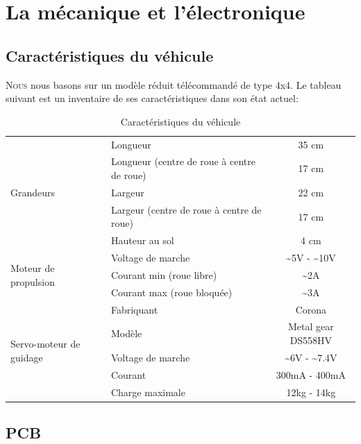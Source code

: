 \documentclass[a4paper,11pt]{report}
\begin{document}
{\chapter{La mécanique et l'électronique}

\section{Caractéristiques du véhicule \label{TableDesc}}
\lettrine{N}{ous} nous basons sur un modèle réduit
télécommandé de type 4x4. Le tableau suivant est un inventaire de 
ses caractéristiques dans son état actuel:
\begin{table}[h!]
\begin{center}
  \begin{tabular}{|p{4cm}|p{4cm}|c|}
    \hline
    \multirow{5}{*}{Grandeurs}
    &Longueur & 35 cm \\ \cline{2-3}
    &Longueur (centre de roue \`a centre de roue)& 17 cm \\ \cline{2-3}
    &Largeur & 22 cm \\ \cline{2-3}
    &Largeur (centre de roue \`a centre de roue) & 17 cm \\ \cline{2-3}
    & Hauteur au sol & 4 cm\\ \hline
    \multirow{3}{*}{Moteur de propulsion}
    & Voltage de marche & \~{}5V - \~{}10V  \\ \cline{2-3}
    & Courant min (roue libre) & \~{}2A \\ \cline{2-3}
    & Courant max (roue bloqu\'ee) & \~{}3A \\ \hline
    \multirow{5}{*}{Servo-moteur de guidage}
    & Fabriquant & Corona \\ \cline{2 - 3}
    & Modèle & Metal gear DS558HV\\ \cline{2-3}
    & Voltage de marche & \~{}6V - \~{}7.4V  \\ \cline{2-3}
    & Courant & 300mA - 400mA \\ \cline{2-3}
    & Charge maximale & 12kg - 14kg \\  
 \hline
	\end{tabular}
\end{center}
\label{caracteristiquesDuVehicule}\caption{Caractéristiques du véhicule}
\end{table}

\section{PCB}

}
\end{document}
